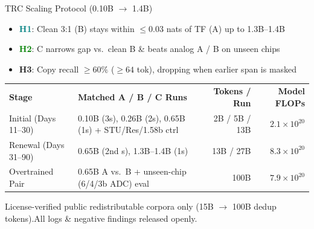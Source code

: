 \documentclass[aspectratio=169,10pt]{beamer}
\newcommand{\accentt}[1]{\textcolor{Teal}{\textbf{#1}}}
\newcommand{\accentg}[1]{\textcolor{Green}{\textbf{#1}}}
\begin{document}
\begin{frame}{TRC Scaling Protocol (0.10B $\to$ 1.4B)}
  \vspace*{0.08cm}
  \begin{itemize}\setlength{\itemsep}{0.44em}
    \item {\normalsize \accentt{H1}: Clean 3:1 (B) stays within $\le 0.03$ nats of TF (A) up to 1.3B--1.4B}
    \item {\normalsize \accentg{H2}: C narrows gap vs.\ clean B \& beats analog A / B on unseen chips}
    \item {\normalsize \textbf{H3}: Copy recall $\ge 60\%$ ($\ge 64$ tok), dropping when earlier span is masked}
  \end{itemize}
  \vspace*{0.35cm}
  \begin{center}
  \footnotesize
  \setlength{\tabcolsep}{5.5pt}
  \renewcommand{\arraystretch}{1.38}
  \begin{tabular}{@{}llrr@{}}
    \textbf{\color{Teal}Stage} & \textbf{\color{Teal}Matched A / B / C Runs} & \textbf{\color{Teal}Tokens / Run} & \textbf{\color{Teal}Model FLOPs} \\
    \arrayrulecolor{Hairline}\midrule
    Initial (Days 11--30) & 0.10B (3s), 0.26B (2s), 0.65B (1s) + STU/Res/1.58b ctrl & 2B / 5B / 13B & $2.1\times 10^{20}$ \\
    \midrule
    Renewal (Days 31--90) & 0.65B (2nd s), 1.3B--1.4B (1s) & 13B / 27B & $8.3\times 10^{20}$ \\
    \midrule
    Overtrained Pair & 0.65B A vs.\ B + unseen-chip (6/4/3b ADC) eval & 100B & $7.9\times 10^{20}$ \\
    \bottomrule
  \end{tabular}
  \end{center}
  \vspace*{0.22cm}
  \begin{center}
    {\scriptsize\color{Muted} License-verified public redistributable corpora only (15B $\to$ 100B dedup tokens).\quad All logs \& negative findings released openly.}
  \end{center}
\end{frame}
\end{document}
